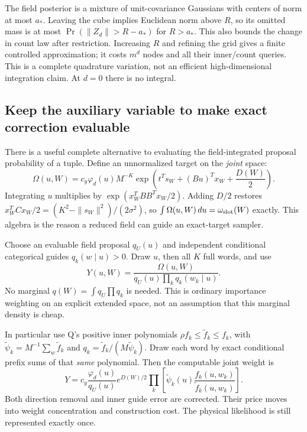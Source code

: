 \documentclass[10pt,a4paper]{article}
\begin{document}
The field posterior is a mixture of unit-covariance Gaussians with centers of norm at most $a_*$.
Leaving the cube implies Euclidean norm above $R$, so its omitted mass is at most
$\Pr(\|Z_d\|>R-a_*)$ for $R>a_*$. This also bounds the change in count law after restriction.
Increasing $R$ and refining the grid gives a finite controlled approximation; it costs $m^d$ nodes
and all their inner/count queries. This is a complete quadrature variation, not an efficient high-dimensional
integration claim. At $d=0$ there is no integral.

\subsection{Keep the auxiliary variable to make exact correction evaluable}
\label{sec:field-joint}
There is a useful complete alternative to evaluating the field-integrated proposal probability of a tuple.
Define an unnormalized target on the \emph{joint} space:
\begin{equation}
 \Omega(u,W)=c_y\varphi_d(u)M^{-K}
       \exp\!\left(t^Ts_W+(Bu)^Tx_W+\frac{D(W)}2\right).
 \label{eq:field-joint}
\end{equation}
Integrating $u$ multiplies by $\exp(x_W^TBB^Tx_W/2)$.
Adding $D/2$ restores $x_W^TCx_W/2=(K^2-\|s_W\|^2)/(2\sigma^2)$, so
$\int\Omega(u,W)\,du=\omega_{\rm slot}(W)$ exactly.
This algebra is the reason a reduced field can guide an exact-target sampler.

Choose an evaluable field proposal $q_U(u)$ and independent conditional categorical guides
$q_k(w\mid u)>0$. Draw $u$, then all $K$ full words, and use
\[
 Y(u,W)=\frac{\Omega(u,W)}
                {q_U(u)\prod_kq_k(w_k\mid u)}.
\]
No marginal $q(W)=\int q_U\prod q_k$ is needed. This is ordinary importance weighting on an
explicit extended space, not an assumption that this marginal density is cheap.

In particular use Q's positive inner polynomials
$\rho f_k\leq\widetilde f_k\leq f_k$, with
$\widetilde\psi_k=M^{-1}\sum_w\widetilde f_k$ and
$q_k=\widetilde f_k/(M\widetilde\psi_k)$.
Draw each word by exact conditional prefix sums of that \emph{same} polynomial.
Then the computable joint weight is
\begin{equation}
 Y=c_y\frac{\varphi_d(u)}{q_U(u)}e^{D(W)/2}
        \prod_k\left[\widetilde\psi_k(u)
                     \frac{f_k(u,w_k)}{\widetilde f_k(u,w_k)}\right].
 \label{eq:field-corrected-weight}
\end{equation}
Both direction removal and inner guide error are corrected. Their price moves into weight
concentration and construction cost. The physical likelihood is still represented exactly once.
\end{document}
